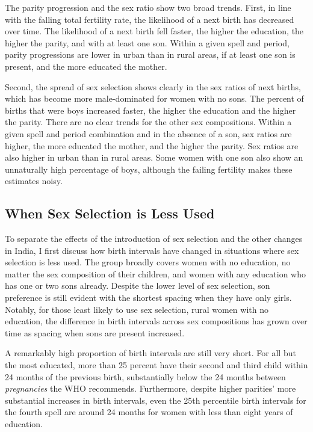 \documentclass[12pt,letterpaper]{article}
\begin{document}
The parity progression and the sex ratio show two broad trends.
First, 
in line with the falling total fertility rate, the likelihood of a next birth 
has decreased over time.
The likelihood of a next birth fell faster, the higher the education, the higher the 
parity, and with at least one son.
Within a given spell and period, parity progressions are lower in urban than in rural areas, 
if at least one son is present, and the more educated the mother.


Second, 
the spread of sex selection shows clearly in the sex ratios of next births, which has 
become more male-dominated for women with no sons.
The percent of births that were boys increased faster, the higher the education and the 
higher the parity.
There are no clear trends for the other sex compositions.
Within a given spell and period combination and in the absence of a son, sex ratios are 
higher, the more educated the mother, and the higher the parity. 
Sex ratios are also higher in urban than in rural areas.
Some women with one son also show an unnaturally high percentage of boys, although the 
failing fertility makes these estimates noisy.


\subsection{When Sex Selection is Less Used}

To separate the effects of the introduction of sex selection and the other changes in
India, I first discuss how birth intervals have changed in situations where sex selection 
is less used.
The group broadly covers women with no education, no matter the sex composition of their 
children, and women with any education who has one or two sons already. 
Despite the lower level of sex selection, son preference is still evident with the 
shortest spacing when they have only girls. 
Notably, for those least likely to use sex selection, rural women with no education, the 
difference in birth intervals across sex compositions has grown over time as spacing when 
sons are present increased.

A remarkably high proportion of birth intervals are still very short.
For all but the most educated, more than 25 percent have their second and third child 
within 24 months of the previous birth, substantially below the 24 months between 
\emph{pregnancies} the WHO recommends.
Furthermore, despite higher parities' more substantial increases in birth intervals, even 
the 25th percentile birth intervals for the fourth spell are around 24 months for women 
with less than eight years of education.
\end{document}
